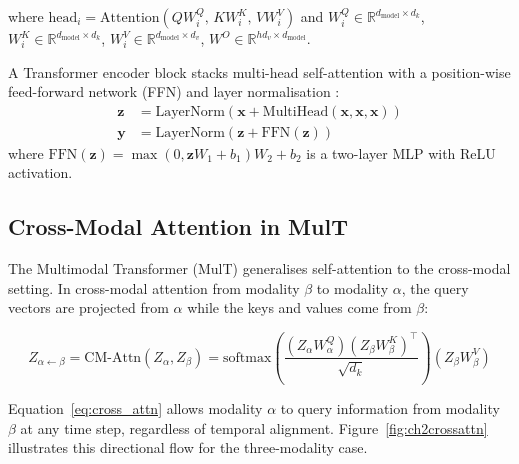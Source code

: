 where $\text{head}_i = \text{Attention}(QW_i^Q,\, KW_i^K,\, VW_i^V)$ and $W_i^Q \in \mathbb{R}^{d_{\text{model}} \times d_k}$, $W_i^K \in \mathbb{R}^{d_{\text{model}} \times d_k}$, $W_i^V \in \mathbb{R}^{d_{\text{model}} \times d_v}$, $W^O \in \mathbb{R}^{hd_v \times d_{\text{model}}}$.

A Transformer encoder block stacks multi-head self-attention with a position-wise feed-forward network (FFN) and layer normalisation \cite{vaswani2017attention}:
\begin{align}
\mathbf{z} &= \text{LayerNorm}\left(\mathbf{x} + \text{MultiHead}(\mathbf{x}, \mathbf{x}, \mathbf{x})\right) \label{eq:ln1}\\
\mathbf{y} &= \text{LayerNorm}\left(\mathbf{z} + \text{FFN}(\mathbf{z})\right) \label{eq:ln2}
\end{align}
where $\text{FFN}(\mathbf{z}) = \max(0, \mathbf{z}W_1 + b_1)W_2 + b_2$ is a two-layer MLP with ReLU activation.

\subsection{Cross-Modal Attention in MulT}

The Multimodal Transformer (MulT) \cite{tsai2019multimodal} generalises self-attention to the cross-modal setting. In cross-modal attention from modality $\beta$ to modality $\alpha$, the query vectors are projected from $\alpha$ while the keys and values come from $\beta$:

\begin{equation}
Z_{\alpha \leftarrow \beta} = \text{CM-Attn}(Z_\alpha, Z_\beta) = \text{softmax}\left(\frac{(Z_\alpha W_\alpha^Q)(Z_\beta W_\beta^K)^\top}{\sqrt{d_k}}\right)(Z_\beta W_\beta^V)
\label{eq:cross_attn}
\end{equation}

Equation~\ref{eq:cross_attn} allows modality $\alpha$ to query information from modality $\beta$ at any time step, regardless of temporal alignment. Figure~\ref{fig:ch2crossattn} illustrates this directional flow for the three-modality case.

